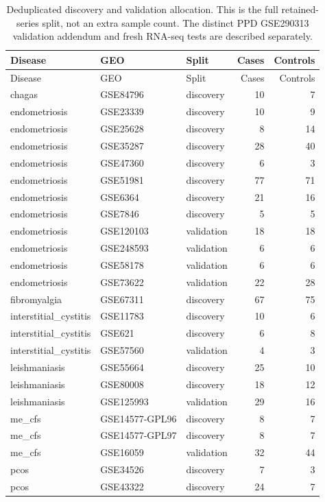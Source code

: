 \begin{longtable}{lllrr}
\caption{Deduplicated discovery and validation allocation. This is the full retained-series split, not an extra sample count. The distinct PPD GSE290313 validation addendum and fresh RNA-seq tests are described separately.}\\
\hline Disease & GEO & Split & Cases & Controls\\\hline\endfirsthead
\hline Disease & GEO & Split & Cases & Controls\\\hline\endhead
chagas & GSE84796 & discovery & 10 & 7\\
endometriosis & GSE23339 & discovery & 10 & 9\\
endometriosis & GSE25628 & discovery & 8 & 14\\
endometriosis & GSE35287 & discovery & 28 & 40\\
endometriosis & GSE47360 & discovery & 6 & 3\\
endometriosis & GSE51981 & discovery & 77 & 71\\
endometriosis & GSE6364 & discovery & 21 & 16\\
endometriosis & GSE7846 & discovery & 5 & 5\\
endometriosis & GSE120103 & validation & 18 & 18\\
endometriosis & GSE248593 & validation & 6 & 6\\
endometriosis & GSE58178 & validation & 6 & 6\\
endometriosis & GSE73622 & validation & 22 & 28\\
fibromyalgia & GSE67311 & discovery & 67 & 75\\
interstitial\_cystitis & GSE11783 & discovery & 10 & 6\\
interstitial\_cystitis & GSE621 & discovery & 6 & 8\\
interstitial\_cystitis & GSE57560 & validation & 4 & 3\\
leishmaniasis & GSE55664 & discovery & 25 & 10\\
leishmaniasis & GSE80008 & discovery & 18 & 12\\
leishmaniasis & GSE125993 & validation & 29 & 16\\
me\_cfs & GSE14577-GPL96 & discovery & 8 & 7\\
me\_cfs & GSE14577-GPL97 & discovery & 8 & 7\\
me\_cfs & GSE16059 & validation & 32 & 44\\
pcos & GSE34526 & discovery & 7 & 3\\
pcos & GSE43322 & discovery & 24 & 7\\

\end{longtable}
